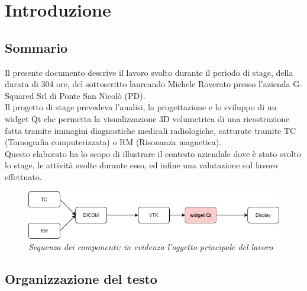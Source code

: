 
\chapter{Introduzione}
\label{cap:introduzione}

\section{Sommario}

Il presente documento descrive il lavoro svolto durante il periodo di stage, della durata di 304 ore, del sottoscritto laureando Michele Roverato presso l'azienda G-Squared Srl di Ponte San Nicolò (PD).
\\
Il progetto di stage prevedeva l'analisi, la progettazione e lo sviluppo di un widget Qt che permetta la visualizzazione 3D volumetrica di una ricostruzione fatta tramite immagini diagnostiche medicali radiologiche, catturate tramite TC (Tomografia computerizzata) o RM (Risonanza magnetica).
\\
Questo elaborato ha lo scopo di illustrare il contesto aziendale dove è stato svolto lo stage, le attività svolte durante esso, ed infine una valutazione sul lavoro effettuato.

\begin{figure}[ht]
    \centering
    \includegraphics[width=1\textwidth]{immagini/schemainiziale.png}
    \caption{\textit{Sequenza dei componenti: in evidenza l'oggetto principale del lavoro}}
\end{figure}

\section{Organizzazione del testo}

